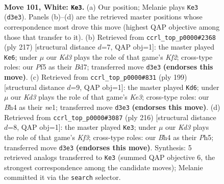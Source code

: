 \documentclass[11pt]{article}
\begin{document}
\clearpage

\begin{figure}[p]\centering
\begin{subfigure}{0.46\textwidth}\centering
\resizebox{\linewidth}{!}{%
\newchessgame
\chessboard[
  setfen={7k/3n4/8/5P2/p6B/P2K3P/8/8 w - - 21 101},
  showmover=false,
  pgfstyle=straightmove, color=movearrow, markmove={d3-e3}
]}
\caption{}
\end{subfigure}\hfill
\begin{subfigure}{0.46\textwidth}\centering
\resizebox{\linewidth}{!}{%
\newchessgame
\chessboard[
  setfen={8/3b1k2/p7/B6p/7P/K7/8/8 b - - 47 109},
  showmover=false,
  pgfstyle=straightmove, color=movearrow, markmove={f7-e6}
]}
\caption{}
\end{subfigure}
\\[4pt]
\begin{subfigure}{0.46\textwidth}\centering
\resizebox{\linewidth}{!}{%
\newchessgame
\chessboard[
  setfen={8/8/4k3/p7/P2K4/8/4p3/4N3 b - - 67 100},
  showmover=false,
  pgfstyle=straightmove, color=movearrow, markmove={e6-d6}
]}
\caption{}
\end{subfigure}\hfill
\begin{subfigure}{0.46\textwidth}\centering
\resizebox{\linewidth}{!}{%
\newchessgame
\chessboard[
  setfen={8/6k1/3p4/p6P/2P4P/5K2/8/8 w - - 0 109},
  showmover=false,
  pgfstyle=straightmove, color=movearrow, markmove={f3-e3}
]}
\caption{}
\end{subfigure}
\caption{\textbf{Move 101, White: \texttt{Ke3}.} (a) Our position; Melanie plays \texttt{Ke3} (\texttt{d3e3}). Panels (b)--(d) are the retrieved master positions whose correspondence most drove this move (highest QAP objective among those that transfer to it). (b) Retrieved from \texttt{ccrl\_top\_p0000\#2368} (ply 217) [structural distance $d$=7, QAP obj=1]: the master played \texttt{Ke6}; under $\mu$ our \emph{Kd3} plays the role of that game's \emph{Kf2}; cross-type roles: our \emph{P}f5 as their \emph{B}d7; transferred move \texttt{d3e3} \textbf{(endorses this move)}. (c) Retrieved from \texttt{ccrl\_top\_p0000\#831} (ply 199) [structural distance $d$=9, QAP obj=1]: the master played \texttt{Kd6}; under $\mu$ our \emph{Kd3} plays the role of that game's \emph{Ke3}; cross-type roles: our \emph{B}h4 as their \emph{n}e1; transferred move \texttt{d3e3} \textbf{(endorses this move)}. (d) Retrieved from \texttt{ccrl\_top\_p0000\#3087} (ply 216) [structural distance $d$=8, QAP obj=1]: the master played \texttt{Ke3}; under $\mu$ our \emph{Kd3} plays the role of that game's \emph{Kf3}; cross-type roles: our \emph{B}h4 as their \emph{P}h5; transferred move \texttt{d3e3} \textbf{(endorses this move)}. Synthesis: 5 retrieved analogs transferred to \texttt{Ke3} (summed QAP objective 6, the strongest correspondence among the candidate moves); Melanie committed it via the \texttt{search} selector.}
\label{fig:thought-m200}
\end{figure}
\end{document}
